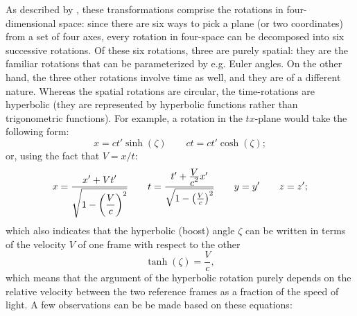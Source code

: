 As described by \citet{Landau1971}, these transformations comprise the rotations in four-dimensional space: since there are six ways to pick a plane (or two coordinates) from a set of four axes, every rotation in four-space can be decomposed into six successive rotations. Of these six rotations, three are purely spatial: they are the familiar rotations that can be parameterized by e.g. Euler angles. On the other hand, the three other rotations involve time as well, and they are of a different nature. Whereas the spatial rotations are circular, the time-rotations are hyperbolic (they are represented by hyperbolic functions rather than trigonometric functions). For example, a rotation in the \(tx\)-plane would take the following form:
\begin{equation}
    x = ct'\sinh(\zeta)\qquad ct = ct'\cosh(\zeta);
    \label{eq:lorentz_transform_hyp}
\end{equation}
or, using the fact that \(V = x/t\):
\begin{equation}
    x = \frac{\displaystyle x' + Vt'}{\displaystyle \sqrt{1 - \qty(\frac{V}{c})^2}} \qquad t = \frac{t' + \frac{\displaystyle V}{\displaystyle c^2}x'}{\sqrt{1 - \qty(\frac{V}{c})^2}} \qquad y = y' \qquad z = z';
    \label{eq:lorentz_transform_sqrt}
\end{equation}
which also indicates that the hyperbolic (boost) angle \(\zeta\) can be written in terms of the velocity \(V\) of one frame with respect to the other
\[ \tanh(\zeta) = \frac{V}{c},\]
which means that the argument of the hyperbolic rotation purely depends on the relative velocity between the two reference frames as a fraction of the speed of light. A few observations can be be made based on these equations: 
